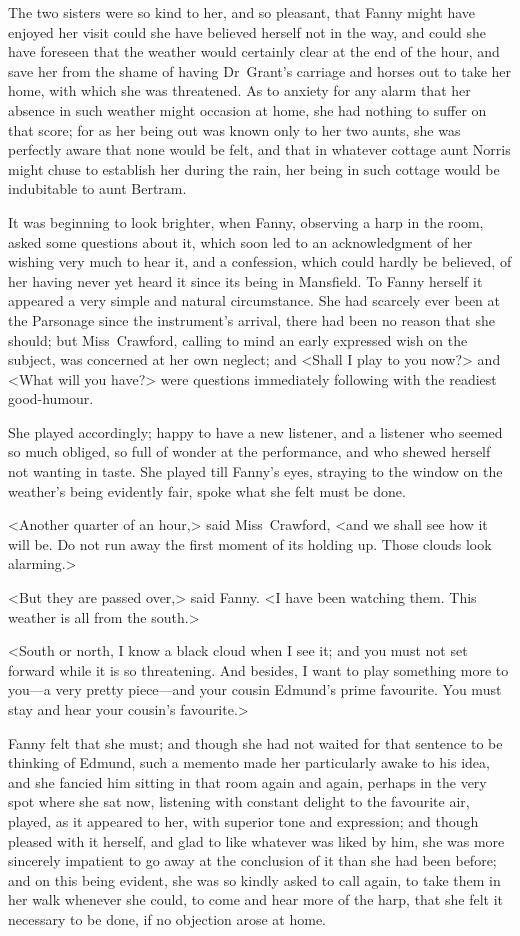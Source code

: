 The two sisters were so kind to her, and so pleasant, that Fanny might have enjoyed her visit could she have believed herself not in the way, and could she have foreseen that the weather would certainly clear at the end of the hour, and save her from the shame of having Dr~Grant's carriage and horses out to take her home, with which she was threatened. As to anxiety for any alarm that her absence in such weather might occasion at home, she had nothing to suffer on that score; for as her being out was known only to her two aunts, she was perfectly aware that none would be felt, and that in whatever cottage aunt Norris might chuse to establish her during the rain, her being in such cottage would be indubitable to aunt Bertram.

It was beginning to look brighter, when Fanny, observing a harp in the room, asked some questions about it, which soon led to an acknowledgment of her wishing very much to hear it, and a confession, which could hardly be believed, of her having never yet heard it since its being in Mansfield. To Fanny herself it appeared a very simple and natural circumstance. She had scarcely ever been at the Parsonage since the instrument's arrival, there had been no reason that she should; but Miss~Crawford, calling to mind an early expressed wish on the subject, was concerned at her own neglect; and <Shall I play to you now?> and <What will you have?> were questions immediately following with the readiest good-humour.

She played accordingly; happy to have a new listener, and a listener who seemed so much obliged, so full of wonder at the performance, and who shewed herself not wanting in taste. She played till Fanny's eyes, straying to the window on the weather's being evidently fair, spoke what she felt must be done.

<Another quarter of an hour,> said Miss~Crawford, <and we shall see how it will be. Do not run away the first moment of its holding up. Those clouds look alarming.>

<But they are passed over,> said Fanny. <I have been watching them. This weather is all from the south.>

<South or north, I know a black cloud when I see it; and you must not set forward while it is so threatening. And besides, I want to play something more to you—a very pretty piece—and your cousin Edmund's prime favourite. You must stay and hear your cousin's favourite.>

Fanny felt that she must; and though she had not waited for that sentence to be thinking of Edmund, such a memento made her particularly awake to his idea, and she fancied him sitting in that room again and again, perhaps in the very spot where she sat now, listening with constant delight to the favourite air, played, as it appeared to her, with superior tone and expression; and though pleased with it herself, and glad to like whatever was liked by him, she was more sincerely impatient to go away at the conclusion of it than she had been before; and on this being evident, she was so kindly asked to call again, to take them in her walk whenever she could, to come and hear more of the harp, that she felt it necessary to be done, if no objection arose at home.

